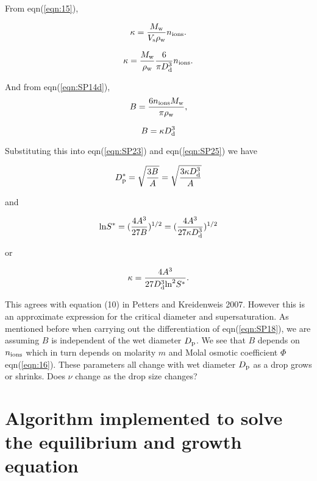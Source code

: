 \documentclass[12pt]{article}
\begin{document}
From eqn(\ref{eqn:15}), 

\begin{equation}\label{eqn:23}
\kappa= \frac{M_{\rm w}}{V_{\rm s} \rho_{\rm w}}n_{\rm ions}.
\end{equation}

\begin{equation}\label{eqn:24}
\kappa= \frac{M_{\rm w}} {\rho_{\rm w}} \frac{6}{\pi D_{\rm d}^{3}} n_{\rm ions}.
\end{equation}


And from eqn(\ref{eqn:SP14d}),
\begin{equation}\label{eqn:25}
B=\frac{6 n_{\rm ions} M_{\rm w}}{\pi \rho_{\rm w}},
\end{equation}

\begin{equation}\label{eqn:26}
B=\kappa D_{\rm d}^{3}
\end{equation}

Substituting this into eqn(\ref{eqn:SP23}) and eqn(\ref{eqn:SP25})
we have 

\begin{equation}\label{eqn:27}
D_{\rm p}^{*}=\sqrt{\frac{3B}{A}}=\sqrt{\frac{3 \kappa D_{\rm d}^{3}}{A}}
\end{equation}

and

\begin{equation}\label{eqn:28}
{\rm ln}  S^{*}=(\frac{4A^{3}}{27B})^{1/2}=(\frac{4A^{3}}{27\kappa D_{\rm d}^{3} })^{1/2}
\end{equation}

or 

\begin{equation}\label{eqn:28}
\kappa=\frac{4A^{3}} {27D_{\rm d}^{3} {\rm ln}^{2} S^{*} }.
\end{equation}

This agrees with equation (10) in Petters and Kreidenweis 2007. However this is an approximate expression for the critical diameter and supersaturation. As mentioned before when carrying out the differentiation of eqn(\ref{eqn:SP18}), we are assuming $B$ is independent of the wet diameter $D_{\rm p}$. We see that $B$ depends on $n_{\rm ions}$ which in turn depends on molarity $m$ and Molal osmotic coefficient $\Phi$ eqn(\ref{eqn:16}). These parameters all change with wet diameter $D_{\rm p}$ as a drop grows or shrinks. 
Does $\nu$ change as the drop size changes?

\section{Algorithm implemented to solve the equilibrium and growth equation}
\end{document}
